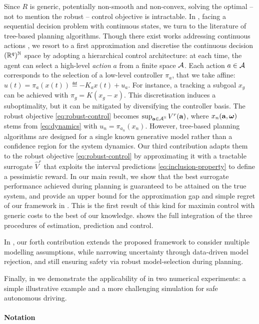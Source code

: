\documentclass{article}
\begin{document}
Since $R$ is generic, potentially non-smooth and non-convex, solving the optimal -- not to mention the robust -- control objective is intractable. In , facing a sequential decision problem with continuous states, we turn to the literature of tree-based planning algorithms. Though there exist works addressing continuous actions \citep{Busoniu2018,Weinstein2012}, we resort to a first approximation and discretise the continuous decision $(\mathbb{R}^q)^{\mathbb{N}}$ space by adopting a hierarchical control architecture: at each time, the agent can select a high-level \emph{action} $a$ from a finite space $\mathcal{A}$. Each action $a\in\mathcal{A}$ corresponds to the selection of a low-level controller $\pi_a$, that we take affine: $u(t) = \pi_a(x(t)) \eqdef -K_a x(t) + u_a.$ For instance, a tracking a subgoal $x_g$ can be achieved with $\pi_g = K(x_g - x)$. This discretisation induces a suboptimality, but it can be mitigated by diversifying the controller basis.
The robust objective \eqref{eq:robust-control} becomes $\sup_{\mathbf{a}\in{\mathcal{A}}^{\mathbb{N}}} V^r(\mathbf{a})$, where $x_n(\mathbf{a}, \bm{\omega})$ stems from \eqref{eq:dynamics} with $u_n = \pi_{a_n}(x_n)$.
However, tree-based planning algorithms are designed for a single known generative model rather than a confidence region for the system dynamics. Our third contribution adapts them to the robust objective \eqref{eq:robust-control} by approximating it with a tractable surrogate $\hat{V}^r$ that exploits the interval predictions \eqref{eq:inclusion-property} to define a pessimistic reward. In our main result, we show that the best surrogate performance achieved during planning is guaranteed to be attained on the true system, and provide an upper bound for the approximation gap and simple regret of our framework in . This is the first result of this kind for maximin control with generic costs to the best of our knowledge.  shows the full integration of the three procedures of estimation, prediction and control. 

In , our forth contribution extends the proposed framework to consider multiple modelling assumptions, while narrowing uncertainty through data-driven model rejection, and still ensuring safety via robust model-selection during planning.

Finally, in  we demonstrate the applicability of  in two numerical experiments: a simple illustrative example and a more challenging simulation for safe autonomous driving.

\paragraph{Notation}
\end{document}
